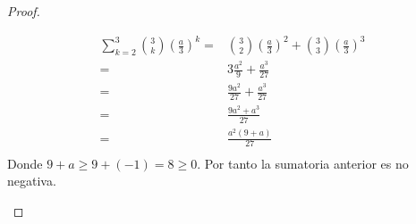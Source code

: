\documentclass[12pt]{article}
\begin{document}
\begin{enumerate}
\begin{proof}
\begin{itemize}
            \begin{equation*}
                \begin{split}
                    \sum_{k=2}^{3}{3 \choose k}\left(\frac{a}{3}\right)^k=&{3 \choose 2}\left(\frac{a}{3}\right)^2+{3 \choose 3}\left(\frac{a}{3}\right)^3\\
                    =&3\frac{a^2}{9}+\frac{a^3}{27}\\
                    =&\frac{9a^2}{27}+\frac{a^3}{27}\\
                    =&\frac{9a^2+a^3}{27}\\
                    =&\frac{a^2\left(9+a\right)}{27}\\
                \end{split}
            \end{equation*}
            Donde $9+a\geq 9+(-1)=8\geq 0$. Por tanto la sumatoria anterior es no negativa.


\end{itemize}
\end{proof}
\end{enumerate}
\end{document}
